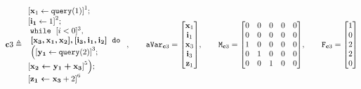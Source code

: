 \documentclass[a4paper,11pt]{article}
\begin{document}
\[
{{\ssa{c}3}  \triangleq
\begin{array}{l}
    \left[\ssa{ x}_1 \leftarrow \query(1)  \right]^1 ;
    \\
    \left[\ssa{i_1} \leftarrow 1 \right]^2 ; 
    \\
    \ewhile ~ [i < 0]^{3} ,
    \\
    ~\ssa{[ x_3,x_1 ,x_2 ], [i_3, i_1, i_2] }
    ~ \edo
    \\
    ~ \Big( 
    \left[\ssa{ y_1} \leftarrow \query(2) \right]^3; \\
    \left[\ssa{x_2 \leftarrow y_1  + x_3 } \right]^5
    \Big) ; \\
    \left[ \ssa{\assign{z_1}{x_3}} + 2  \right]^{6}
\end{array},
~~~~~~
\avar_{\ssa{c}3} = \left [ \begin{matrix}
\ssa{x}_1 \\
\ssa{i}_1 \\
\ssa{x}_3 \\
\ssa{i}_3 \\
\ssa{z}_1 \\
\end{matrix} \right ]
,~~~~~~
\Mtrix_{\ssa{c}3}  =  \left[ \begin{matrix}
 0 & 0 & 0 & 0 & 0 \\
 0 & 0 & 0 & 0 & 0 \\
 1 & 0 & 0 & 0 & 0 \\
 0 & 1 & 0 & 0 & 0 \\
 0 & 0 & 1 & 0 & 0 \\
\end{matrix} \right]
,~~~~~~
\flag_{\ssa{c}3} = \left [ \begin{matrix}
 1 \\
 0 \\
 2 \\
 2 \\
 0 \\
\end{matrix} \right ]
}
\]
\end{document}
